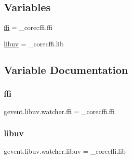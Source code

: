 \subsection*{Variables}
\begin{DoxyCompactItemize}
\item 
\hyperlink{namespacegevent_1_1libuv_1_1watcher_a862c78011b3ac1d98b835b7aa60a715d}{ffi} = \+\_\+corecffi.\+ffi
\item 
\hyperlink{namespacegevent_1_1libuv_1_1watcher_a9fb4b866c155f1787b5a95705445ec70}{libuv} = \+\_\+corecffi.\+lib
\end{DoxyCompactItemize}


\subsection{Variable Documentation}
\mbox{\label{namespacegevent_1_1libuv_1_1watcher_a862c78011b3ac1d98b835b7aa60a715d}} 
\subsubsection{\texorpdfstring{ffi}{ffi}}
{\footnotesize\ttfamily gevent.\+libuv.\+watcher.\+ffi = \+\_\+corecffi.\+ffi}

\mbox{\label{namespacegevent_1_1libuv_1_1watcher_a9fb4b866c155f1787b5a95705445ec70}} 
\subsubsection{\texorpdfstring{libuv}{libuv}}
{\footnotesize\ttfamily gevent.\+libuv.\+watcher.\+libuv = \+\_\+corecffi.\+lib}


